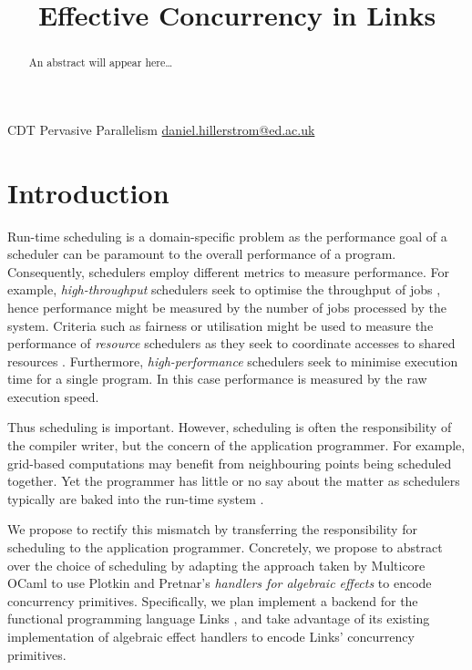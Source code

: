\documentclass[preprint,10pt,numbers]{sigplanconf}
\begin{document}
\title{Effective Concurrency in Links}

           {CDT Pervasive Parallelism}
           {\href{mailto:daniel.hillerstrom@ed.ac.uk}{daniel.hillerstrom@ed.ac.uk}}
  \maketitle
  \begin{abstract}
    An abstract will appear here\dots
  \end{abstract}
  \raggedbottom
  \section{Introduction}
Run-time scheduling is a domain-specific problem as the performance goal of a scheduler can be paramount to the overall performance of a program. Consequently, schedulers employ different metrics to measure performance. For example, \emph{high-throughput} schedulers seek to optimise the throughput of jobs \cite{Berman2003}, hence performance might be measured by the number of jobs processed by the system. Criteria such as fairness or utilisation might be used to measure the performance of \emph{resource} schedulers as they seek to coordinate accesses to shared resources \cite{Berman2003}. Furthermore, \emph{high-performance} schedulers seek to minimise execution time for a single program. In this case performance is measured by the raw execution speed.

Thus scheduling is important. However, scheduling is often the responsibility of the compiler writer, but the concern of the application programmer. For example, grid-based computations may benefit from neighbouring points being scheduled together. Yet the programmer has little or no say about the matter as schedulers typically are baked into the run-time system \cite{Dolan2015}. 

We propose to rectify this mismatch by transferring the responsibility for scheduling to the application programmer. Concretely, we propose to abstract over the choice of scheduling by adapting the approach taken by Multicore OCaml \cite{Dolan2015} to use Plotkin and Pretnar's \emph{handlers for algebraic effects} \cite{Plotkin2013} to encode concurrency primitives. Specifically, we plan implement a backend for the functional programming language Links \cite{Cooper2006}, and take advantage of its existing implementation of algebraic effect handlers \cite{Hillerstrom2015} to encode Links' concurrency primitives.
\end{document}
